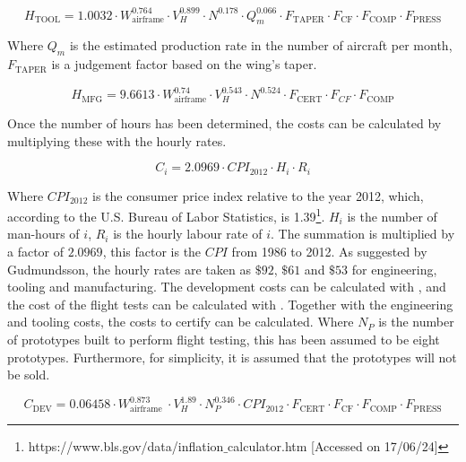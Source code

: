 \begin{equation}
    \label{eq:cost:ManHours_Tooling}
    H_{\text{TOOL}}=  1.0032 \cdot W_{\text{airframe}}^{0.764} \cdot V_H^{0.899} \cdot N^{0.178} \cdot Q_m^{0.066} \cdot F_{\text{TAPER}} \cdot F_{\text{CF}} \cdot F_{\text{COMP}} \cdot F_{\text{PRESS}}
\end{equation}

Where $Q_m$ is the estimated production rate in the number of aircraft per month, $F_{\text{TAPER}}$ is a judgement factor based on the wing's taper.

\begin{equation}
    \label{eq:cost:ManHours_Manufacturing}
    H_{\text{MFG}}=  9.6613 \cdot W_{\text{airframe}}^{0.74} \cdot V_H^{0.543} \cdot N^{0.524} \cdot F_{\text{CERT}} \cdot F_{C F} \cdot F_{\text{COMP}}
\end{equation}

Once the number of hours has been determined, the costs can be calculated by multiplying these with the hourly rates. 

\begin{equation}
    \label{eq:cost:Manhour_cost}
    C_{i} = 2.0969 \cdot CPI_{2012} \cdot H_{i} \cdot R_{i} 
\end{equation}

Where $CPI_{2012}$ is the consumer price index relative to the year 2012,
which, according to the U.S. Bureau of Labor Statistics,
is 1.39\footnote{https://www.bls.gov/data/inflation$\_$calculator.htm [Accessed on 17/06/24]}.
$H_i$ is the number of man-hours of $i$, $R_i$ is the hourly labour rate of $i$.
The summation is multiplied by a factor of $2.0969$, this factor is the $CPI$ from 1986 to 2012.
As suggested by Gudmundsson, the hourly rates are taken as $\$92$, $\$61$ and $\$53$ for engineering, tooling and manufacturing.
The development costs can be calculated with , and the cost of the flight tests can be calculated with .
Together with the engineering and tooling costs, the costs to certify can be calculated.
Where $N_P$ is the number of prototypes built to perform flight testing, this has been assumed to be eight prototypes.
Furthermore, for simplicity, it is assumed that the prototypes will not be sold.

\begin{equation}
    \label{eq:cost:DEVcost}
    C_{\text{DEV}}=0.06458 \cdot W_{\text{airframe }}^{0.873} \cdot V_H^{1.89} \cdot N_P^{0.346} \cdot C P I_{2012} \cdot F_{\text{CERT}} \cdot F_{\text{CF}} \cdot F_{\text{COMP}} \cdot F_{\text{PRESS}}
\end{equation}

